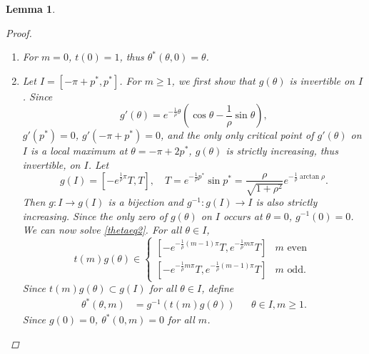 \documentclass[12pt]{elsarticle}
\theoremstyle{plain}
\newtheorem{lemma}[theorem]{Lemma}
\theoremstyle{definition}
\theoremstyle{remark}
\numberwithin{theorem}{section}
\numberwithin{equation}{section}
\begin{document}
\begin{lemma}
\begin{proof}
\begin{enumerate}
\begin{equation}\label{thetaeq1}
e^{-\frac{1}{\rho}\theta^*}\sin \theta^* = e^{-\frac{1}{\rho}(m_1 - m_0) \pi} (-1)^{m_1 - m_0} e^{-\frac{1}{\rho}\theta}\sin \theta = 0,
\end{equation}
which only depends on $m_1 - m_0$. Letting $m = m_1 - m_0$, it suffices to solve
\begin{equation}\label{thetaeq2}
g(\theta^*) = t(m) g(\theta)
\end{equation}
for all nonnegative integers $m$, where $g(\theta) = e^{-\frac{1}{\rho}\theta}\sin \theta$ and $t(m) = (-1)^m e^{-\frac{1}{\rho}m \pi}$. 

\item For $m = 0$, $t(0) = 1$, thus $\theta^*(\theta, 0) = \theta$.

\item Let $I = [-\pi + p^*, p^*]$. For $m \geq 1$, we first show that $g(\theta)$ is invertible on $I$. Since
\begin{equation}\label{gprime}
g'(\theta) = e^{ -\frac{1}{\rho} \theta } \left( \cos \theta - \frac{1}{\rho} \sin \theta \right),
\end{equation}
$g'(p^*) = 0$, $g'(-\pi+p^*) = 0$, and the only only critical point of $g'(\theta)$ on $I$ is a local maximum at $\theta = - \pi + 2 p^*$, $g(\theta)$ is strictly increasing, thus invertible, on $I$. Let
\begin{equation*}
g(I) = [-e^{\frac{1}{\rho}\pi} T, T], \quad T = e^{-\frac{1}{\rho}p^*} \sin p^* = \frac{\rho}{\sqrt{1+\rho^2}}e^{-\frac{1}{\rho}\arctan \rho}.
\end{equation*}
Then $g: I \rightarrow g(I)$ is a bijection and $g^{-1}: g(I) \rightarrow I$ is also strictly increasing. Since the only zero of $g(\theta)$ on $I$ occurs at $\theta = 0$, $g^{-1}(0) = 0$. We can now solve \cref{thetaeq2}. For all $\theta \in I$,
\begin{equation}\label{RHSbounds}
	t(m)g(\theta) \in
	\begin{cases}
	[-e^{-\frac{1}{\rho}(m-1) \pi} T, e^{-\frac{1}{\rho}m \pi} T] & m \text{ even }\\
	[-e^{-\frac{1}{\rho}m \pi} T, e^{-\frac{1}{\rho}(m-1) \pi} T] & m \text{ odd.}
	\end{cases}
\end{equation}
Since $t(m)g(\theta) \subset g(I)$ for all $\theta \in I$, define
\begin{align}\label{solvethetastar}
\theta^*(\theta, m) &= g^{-1}\left( t(m) g(\theta) \right) && \theta \in I, m \geq 1.
\end{align}
Since $g(0) = 0$, $\theta^*(0, m) = 0$ for all $m$.


\end{enumerate}
\end{proof}
\end{lemma}
\end{document}
